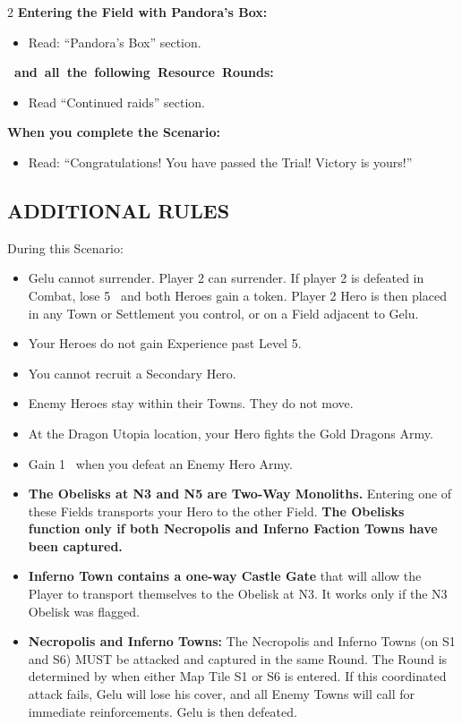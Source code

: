 \begin{multicols*}{2}
\textbf{Entering the Field with Pandora's Box:}
\begin{itemize}
  \item Read: ``Pandora's Box'' section.
\end{itemize}

\textbf{\mbox{ and all the following Resource Rounds:}}
\begin{itemize}
  \item Read ``Continued raids'' section.
\end{itemize}

\textbf{When you complete the Scenario:}
\begin{itemize}
  \item Read: ``Congratulations! You have passed the Trial! Victory is yours!''
\end{itemize}

\columnbreak

\subsection*{\MakeUppercase{Additional Rules}}

During this Scenario:

\begin{itemize}
    \item Gelu cannot surrender.
      Player 2 can surrender.
      If player 2 is defeated in Combat, lose 5~ and both Heroes gain a  token.
      Player 2 Hero is then placed in any Town or Settlement you control, or on a Field adjacent to Gelu.
    \item Your Heroes do not gain Experience past Level 5.
    \item You cannot recruit a Secondary Hero.
    \item Enemy Heroes stay within their Towns. They do not move.
    \item At the Dragon Utopia location, your Hero fights the Gold Dragons Army.
    \item Gain 1~ when you defeat an Enemy Hero Army.
    \item \textbf{The Obelisks at N3 and N5 are Two-Way Monoliths.}
      Entering one of these Fields transports your Hero to the other Field. \textbf{The Obelisks function only if both Necropolis and Inferno Faction Towns have been captured.}
    \item \textbf{Inferno Town contains a one-way Castle Gate} that will allow the Player to transport themselves to the Obelisk at N3. It works only if the N3 Obelisk was flagged.
  \item \textbf{Necropolis and Inferno Towns:} The Necropolis and Inferno Towns (on S1 and S6) MUST be attacked and captured in the same Round.
    The Round is determined by when either Map Tile S1 or S6 is entered.
    If this coordinated attack fails, Gelu will lose his cover, and all Enemy Towns will call for immediate reinforcements.
    Gelu is then defeated.
\end{itemize}

\end{multicols*}

